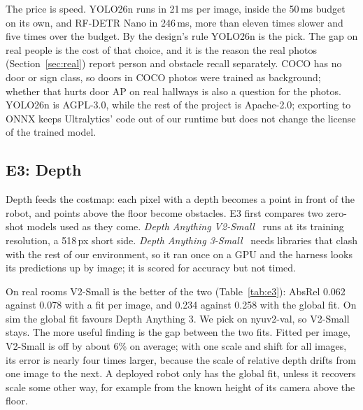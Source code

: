 \documentclass[conference]{IEEEtran}
\begin{document}
The price is speed. YOLO26n runs in 21\,ms per image, inside the 50\,ms
budget on its own, and RF-DETR Nano in 246\,ms, more than eleven times
slower and five times over the budget. By the design's rule YOLO26n is the pick. The gap
on real people is the cost of that choice, and it is the reason the real
photos (Section~\ref{sec:real}) report person and obstacle recall separately.
COCO has no door or sign class, so doors in COCO photos were trained as
background; whether that hurts door AP on real hallways is also a question
for the photos. YOLO26n is AGPL-3.0, while the rest of the project is
Apache-2.0; exporting to ONNX keeps Ultralytics' code out of our runtime but
does not change the license of the trained model.

\subsection{E3: Depth}
\label{sec:e3}

Depth feeds the costmap: each pixel with a depth becomes a point in front of
the robot, and points above the floor become obstacles. E3 first compares
two zero-shot models used as they come. \emph{Depth Anything
V2-Small}~\cite{yang2024depthv2} runs at its training resolution, a 518\,px
short side. \emph{Depth Anything 3-Small}~\cite{lin2026depth3} needs
libraries that clash with the rest of our environment, so it ran once on a
GPU and the harness looks its predictions up by image; it is scored for
accuracy but not timed.

\begin{table}[t]
\caption{E3 depth. $\delta_1$ and AbsRel on 200 held-out NYUv2 images with
one global scale and shift (what the robot could use) and with a fit per image
(an upper bound), and $\delta_1$ per image on the v9 sim validation set.
AbsRel is lower-better. Latency on the M1, two threads; Depth Anything 3 ran
on a GPU and is untimed. $^\dagger$: on the Pareto front of global $\delta_1$
against latency.}
\label{tab:e3}
\centering
\footnotesize
\setlength{\tabcolsep}{4pt}

\end{table}

On real rooms V2-Small is the better of the two (Table~\ref{tab:e3}): AbsRel
0.062 against 0.078 with a fit per image, and 0.234 against 0.258 with the
global fit. On sim the global fit favours Depth Anything 3. We pick on
nyuv2-val, so V2-Small stays. The more useful finding is the gap between the
two fits. Fitted per image, V2-Small is off by about 6\% on average;
with one scale and shift for all images, its error is nearly four times
larger, because the scale of relative depth drifts from one image to the
next. A deployed robot only has the global fit, unless it recovers scale some
other way, for example from the known height of its camera above the floor.
\end{document}
